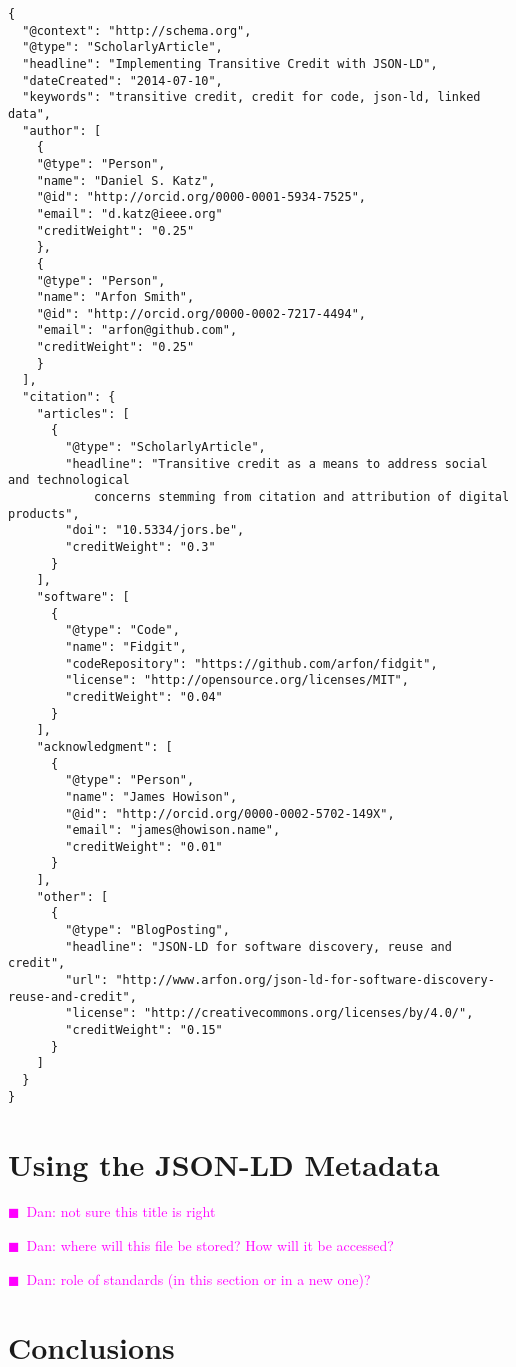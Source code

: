\documentclass[a4paper,10pt]{article}
\newcommand{\katznote}[1]{ {\textcolor{magenta}    {$\blacksquare$~Dan:      #1 }}}
\begin{document}
{\footnotesize
\begin{verbatim}
{
  "@context": "http://schema.org",
  "@type": "ScholarlyArticle",
  "headline": "Implementing Transitive Credit with JSON-LD",
  "dateCreated": "2014-07-10",
  "keywords": "transitive credit, credit for code, json-ld, linked data",
  "author": [
    {
    "@type": "Person",
    "name": "Daniel S. Katz",
    "@id": "http://orcid.org/0000-0001-5934-7525",
    "email": "d.katz@ieee.org"
    "creditWeight": "0.25"
    },
    {
    "@type": "Person",
    "name": "Arfon Smith",
    "@id": "http://orcid.org/0000-0002-7217-4494",
    "email": "arfon@github.com",
    "creditWeight": "0.25"
    }
  ],
  "citation": {
    "articles": [
      {
        "@type": "ScholarlyArticle",
        "headline": "Transitive credit as a means to address social and technological 
            concerns stemming from citation and attribution of digital products",
        "doi": "10.5334/jors.be",
        "creditWeight": "0.3"
      }
    ],
    "software": [
      {
        "@type": "Code",
        "name": "Fidgit",
        "codeRepository": "https://github.com/arfon/fidgit",
        "license": "http://opensource.org/licenses/MIT",
        "creditWeight": "0.04"
      }
    ],
    "acknowledgment": [
      {
        "@type": "Person",
        "name": "James Howison",
        "@id": "http://orcid.org/0000-0002-5702-149X",
        "email": "james@howison.name",
        "creditWeight": "0.01"
      }
    ],
    "other": [
      {
        "@type": "BlogPosting",
        "headline": "JSON-LD for software discovery, reuse and credit",
        "url": "http://www.arfon.org/json-ld-for-software-discovery-reuse-and-credit",
        "license": "http://creativecommons.org/licenses/by/4.0/",
        "creditWeight": "0.15"
      }
    ]
  }
}
\end{verbatim}
}


\section{Using the JSON-LD Metadata}

\katznote{not sure this title is right}

\katznote{where will this file be stored?  How will it be accessed?}

\katznote{role of standards (in this section or in a new one)?}

\section{Conclusions}
\end{document}
